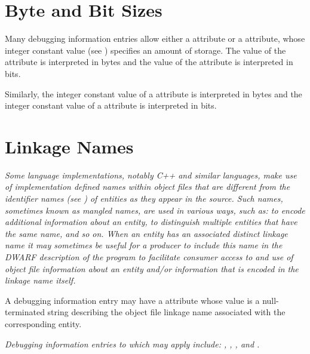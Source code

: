 \section{Byte and Bit Sizes}
\label{chap:byteandbitsizes}
Many debugging information entries allow either a
 attribute or a  attribute,
whose integer constant value 
(see ) 
specifies an
amount of storage. The value of the  attribute
is interpreted in bytes and the value of the 
attribute is interpreted in bits.  

Similarly, the integer
constant value of a  attribute is interpreted
in bytes and the integer constant value of a 
attribute is interpreted in bits.

\section{Linkage Names}
\label{chap:linkagenames}
\textit{Some language implementations, notably C++ and similar
languages, make use of implementation defined names within
object files that are different from the identifier names
(see ) of entities as they appear in the
source. Such names, sometimes known as mangled names,
are used in various ways, such as: to encode additional
information about an entity, to distinguish multiple entities
that have the same name, and so on. When an entity has an
associated distinct linkage name it may sometimes be useful
for a producer to include this name in the DWARF description
of the program to facilitate consumer access to and use of
object file information about an entity and/or information
that is encoded in the linkage name itself.  
}

A debugging
information entry may have a  attribute
whose value is a null-terminated string describing the object
file linkage name associated with the corresponding entity.

\textit{Debugging information entries to which 
may apply include: , ,
,  
and .
}
